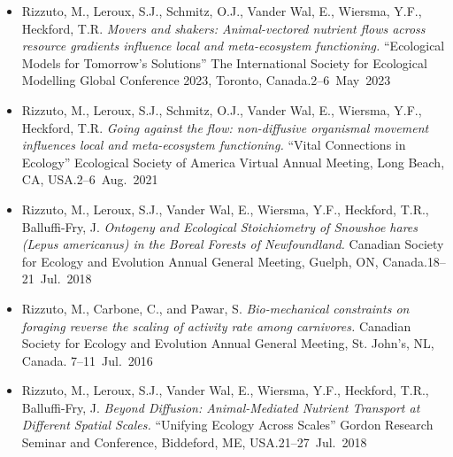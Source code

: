 


\begin{itemize}
  \item \textcolor{awesome}{Rizzuto, M.}, Leroux, S.J., Schmitz, O.J., Vander Wal, E., Wiersma, Y.F., Heckford, T.R. \emph{Movers and shakers: Animal-vectored nutrient flows across resource gradients influence local and meta-ecosystem functioning.} ``Ecological Models for Tomorrow's Solutions'' The International Society for Ecological Modelling Global Conference 2023, Toronto, Canada.\hfill 2--6~May~2023
  \item \textcolor{awesome}{Rizzuto, M.}, Leroux, S.J., Schmitz, O.J., Vander Wal, E., Wiersma, Y.F., Heckford, T.R. \emph{Going against the flow: non-diffusive organismal movement influences local and meta-ecosystem functioning.} ``Vital Connections in Ecology'' Ecological Society of America Virtual Annual Meeting, Long Beach, CA, USA.\hfill 2--6~Aug.~2021
  \item \textcolor{awesome}{Rizzuto, M.}, Leroux, S.J., Vander Wal, E., Wiersma, Y.F., Heckford, T.R., Balluffi-Fry, J. \emph{Ontogeny and Ecological Stoichiometry of Snowshoe hares (Lepus americanus) in the Boreal Forests of Newfoundland.} Canadian Society for Ecology and Evolution Annual General Meeting, Guelph, ON, Canada.\hfill 18--21~Jul.~2018 
  \item \textcolor{awesome}{Rizzuto, M.}, Carbone, C., and Pawar, S. \emph{Bio-mechanical constraints on foraging reverse the scaling of activity rate among carnivores.} Canadian Society for Ecology and Evolution Annual General Meeting, St. John's, NL,\\ Canada. \hfill 7--11~Jul.~2016
\end{itemize}


\begin{itemize}
  \item \textcolor{awesome}{Rizzuto, M.}, Leroux, S.J., Vander Wal, E., Wiersma, Y.F., Heckford, T.R., Balluffi-Fry, J. \emph{Beyond Diffusion: Animal-Mediated Nutrient Transport at Different Spatial Scales.} ``Unifying Ecology Across Scales'' Gordon Research Seminar and Conference, Biddeford, ME, USA.\hfill 21--27~Jul.~2018
\end{itemize}

